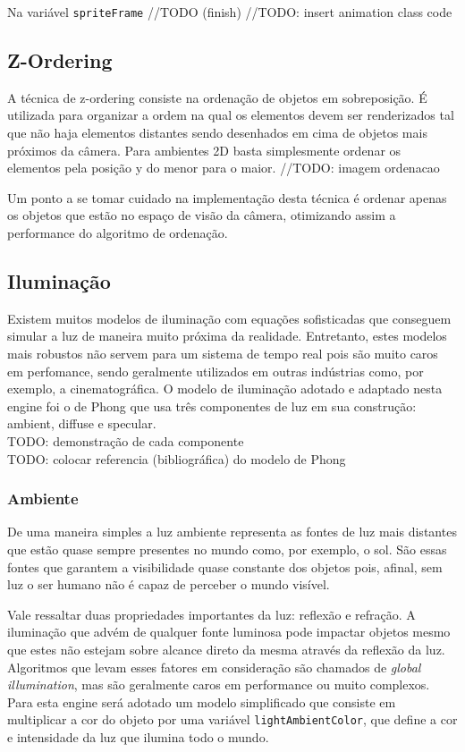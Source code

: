 \documentclass[12pt, 
openright, 
oneside, 
a4paper,    
brazil]{facom-ufu-abntex2}
\begin{document}
Na variável \texttt{spriteFrame}  //TODO (finish)
//TODO: insert animation class code

\subsection{Z-Ordering}
A técnica de z-ordering consiste na ordenação de objetos em sobreposição. É utilizada para organizar a ordem na qual os elementos devem ser renderizados tal que não haja elementos distantes sendo desenhados em cima de objetos mais próximos da câmera.
Para ambientes 2D basta simplesmente ordenar os elementos pela posição y do menor para o maior. 
//TODO: imagem ordenacao

Um ponto a se tomar cuidado na implementação desta técnica é ordenar apenas os objetos que estão no espaço de visão da câmera, otimizando assim a performance do algoritmo de ordenação.


\subsection{Iluminação}
Existem muitos modelos de iluminação com equações sofisticadas que conseguem simular a luz de maneira muito próxima da realidade. Entretanto, estes modelos mais robustos não servem para um sistema de tempo real pois são muito caros em perfomance, sendo geralmente utilizados em outras indústrias como, por exemplo, a cinematográfica.
O modelo de iluminação adotado e adaptado nesta engine foi o de Phong que usa três componentes de luz em sua construção: ambient, diffuse e specular.
\\TODO: demonstração de cada componente
\\TODO: colocar referencia (bibliográfica) do modelo de Phong

\subsubsection{Ambiente}
De uma maneira simples a luz ambiente representa as fontes de luz mais distantes que estão quase sempre presentes no mundo como, por exemplo, o sol. São essas fontes que garantem a visibilidade quase constante dos objetos pois, afinal, sem luz o ser humano não é capaz de perceber o mundo visível.

Vale ressaltar duas propriedades importantes da luz: reflexão e refração. A iluminação que advém de qualquer fonte luminosa pode impactar objetos mesmo que estes não estejam sobre alcance direto da mesma através da reflexão da luz. Algoritmos que levam esses fatores em consideração são chamados de \textit{global illumination}, mas são geralmente caros em performance ou muito complexos.
Para esta engine será adotado um modelo simplificado que consiste em multiplicar a cor do objeto por uma variável \texttt{lightAmbientColor}, que define a cor e intensidade da luz que ilumina todo o mundo.
\end{document}
